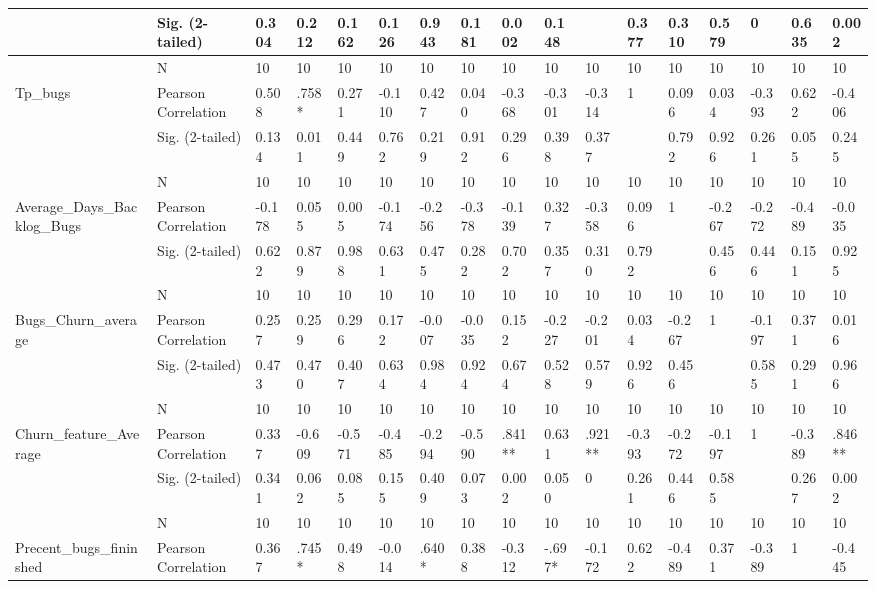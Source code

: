 \documentclass[UKenglish]{ifimaster}  %
\begin{document}
\begin{table}[!htbp]
\begin{adjustwidth}{-2.5cm}{}
{\begin{tabular}{ | l | l | l | l | l | l | l | l | l | l | l | l | l | l | l | l | l | }
	 & Sig. (2-tailed) & 0.304 & 0.212 & 0.162 & 0.126 & 0.943 & 0.181 & 0.002 & 0.148 &  & 0.377 & 0.310 & 0.579 & 0 & 0.635 & 0.002\\ \hline
	 & N & 10 & 10 & 10 & 10 & 10 & 10 & 10 & 10 & 10 & 10 & 10 & 10 & 10 & 10 & 10 \\ \hline
	Tp\_bugs & Pearson Correlation & 0.508 & .758* & 0.271 & -0.110 & 0.427 & 0.040 & -0.368 & -0.301 & -0.314 & 1 & 0.096 & 0.034 & -0.393 & 0.622 & -0.406\\ \hline
	 & Sig. (2-tailed) & 0.134 & 0.011 & 0.449 & 0.762 & 0.219 & 0.912 & 0.296 & 0.398 & 0.377 &  & 0.792 & 0.926 & 0.261 & 0.055 & 0.245\\ \hline
	 & N & 10 & 10 & 10 & 10 & 10 & 10 & 10 & 10 & 10 & 10 & 10 & 10 & 10 & 10 & 10 \\ \hline
	Average\_Days\_Backlog\_Bugs & Pearson Correlation & -0.178 & 0.055 & 0.005 & -0.174 & -0.256 & -0.378 & -0.139 & 0.327 & -0.358 & 0.096 & 1 & -0.267 & -0.272 & -0.489 & -0.035\\ \hline
	 & Sig. (2-tailed) & 0.622 & 0.879 & 0.988 & 0.631 & 0.475 & 0.282 & 0.702 & 0.357 & 0.310 & 0.792 &  & 0.456 & 0.446 & 0.151 & 0.925\\ \hline
	 & N & 10 & 10 & 10 & 10 & 10 & 10 & 10 & 10 & 10 & 10 & 10 & 10 & 10 & 10 & 10 \\ \hline
	Bugs\_Churn\_average & Pearson Correlation & 0.257 & 0.259 & 0.296 & 0.172 & -0.007 & -0.035 & 0.152 & -0.227 & -0.201 & 0.034 & -0.267 & 1 & -0.197 & 0.371 & 0.016\\ \hline
	 & Sig. (2-tailed) & 0.473 & 0.470 & 0.407 & 0.634 & 0.984 & 0.924 & 0.674 & 0.528 & 0.579 & 0.926 & 0.456 &  & 0.585 & 0.291 & 0.966\\ \hline
	 & N & 10 & 10 & 10 & 10 & 10 & 10 & 10 & 10 & 10 & 10 & 10 & 10 & 10 & 10 & 10 \\ \hline
	Churn\_feature\_Average & Pearson Correlation & 0.337 & -0.609 & -0.571 & -0.485 & -0.294 & -0.590 & .841** & 0.631 & .921** & -0.393 & -0.272 & -0.197 & 1 & -0.389 & .846** \\ \hline
	 & Sig. (2-tailed) & 0.341 & 0.062 & 0.085 & 0.155 & 0.409 & 0.073 & 0.002 & 0.050 & 0 & 0.261 & 0.446 & 0.585 &  & 0.267 & 0.002\\ \hline
	 & N & 10 & 10 & 10 & 10 & 10 & 10 & 10 & 10 & 10 & 10 & 10 & 10 & 10 & 10 & 10 \\ \hline
	Precent\_bugs\_fininshed & Pearson Correlation & 0.367 & .745* & 0.498 & -0.014 & .640* & 0.388 & -0.312 & -.697* & -0.172 & 0.622 & -0.489 & 0.371 & -0.389 & 1 & -0.445\\ \hline

\end{tabular}}
\end{adjustwidth}
\end{table}
\end{document}
